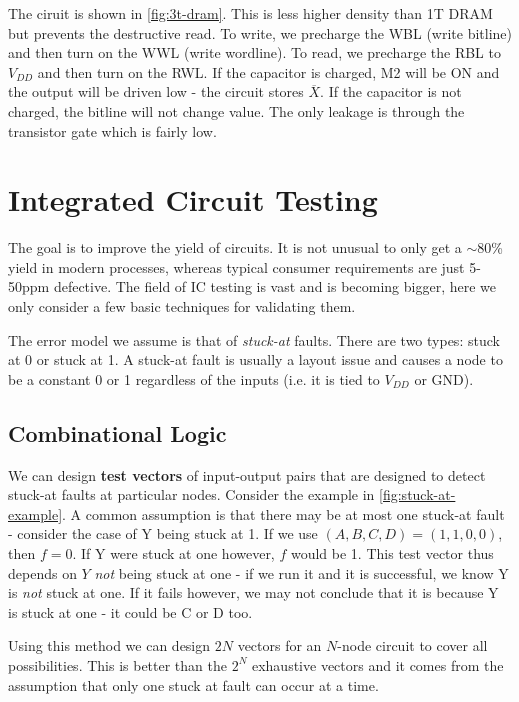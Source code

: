 \documentclass[11pt]{report}
\begin{document}
The ciruit is shown in \autoref{fig:3t-dram}. This is less higher density than 1T DRAM but prevents the destructive read. To write, we precharge the WBL (write bitline) and then turn on the WWL (write wordline). To read, we precharge the RBL to $V_{DD}$ and then turn on the RWL. If the capacitor is charged, M2 will be ON and the output will be driven low - the circuit stores $\overline{X}$. If the capacitor is not charged, the bitline will not change value. The only leakage is through the transistor gate which is fairly low.

\chapter{Integrated Circuit Testing}

The goal is to improve the yield of circuits. It is not unusual to only get a $\sim$80\% yield in modern processes, whereas typical consumer requirements are just 5-50ppm defective. The field of IC testing is vast and is becoming bigger, here we only consider a few basic techniques for validating them.

The error model we assume is that of \textit{stuck-at} faults. There are two types: stuck at 0 or stuck at 1. A stuck-at fault is usually a layout issue and causes a node to be a constant 0 or 1 regardless of the inputs (i.e. it is tied to $V_{DD}$ or GND).

\section{Combinational Logic}\label{sec:combinational-test}
We can design \textbf{test vectors} of input-output pairs that are designed to detect stuck-at faults at particular nodes. Consider the example in \autoref{fig:stuck-at-example}. A common assumption is that there may be at most one stuck-at fault - consider the case of Y being stuck at 1. If we use $(A, B, C, D) = (1, 1, 0, 0)$, then $f = 0$. If Y were stuck at one however, $f$ would be 1. This test vector thus depends on $Y$ \textit{not} being stuck at one - if we run it and it is successful, we know Y is \textit{not} stuck at one. If it fails however, we may not conclude that it is because Y is stuck at one - it could be C or D too.

Using this method we can design $2N$ vectors for an $N$-node circuit to cover all possibilities. This is better than the $2^N$ exhaustive vectors and it comes from the assumption that only one stuck at fault can occur at a time.
\end{document}
